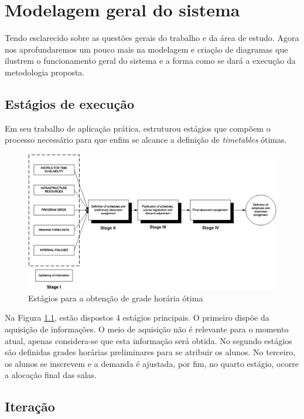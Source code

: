 \chapter{Modelagem geral do sistema}

Tendo esclarecido sobre as questões gerais do trabalho e da área de estudo. Agora nos aprofundaremos um pouco mais na modelagem e criação de diagramas que ilustrem o funcionamento geral do sistema e a forma como se dará a execução da metodologia proposta.

\section{Estágios de execução}

Em seu trabalho de aplicação prática, \cite{miranda_udpskeduler_2012} estruturou estágios que compõem o processo necessário para que enfim se alcance a definição de \textit{timetables} ótimas.

\begin{figure}[htbp]\centering
    \caption{\label{fig:geral} Estágios para a obtenção de grade horária ótima}
    \includegraphics[scale=0.5]{files/img/Arquitetura/Arquitetura-UDP.png}
\end{figure}

Na Figura \ref{fig:geral}, estão dispostos 4 estágios principais. O primeiro dispõe da aquisição de informações. O meio de aquisição não é relevante para o momento atual, apenas considera-se que esta informação será obtida. No segundo estágios são definidas grades horárias preliminares para se atribuir os alunos. No terceiro, os alunos se inscrevem e a demanda é ajustada, por fim, no quarto estágio, ocorre a alocação final das salas.

\section{Iteração}

